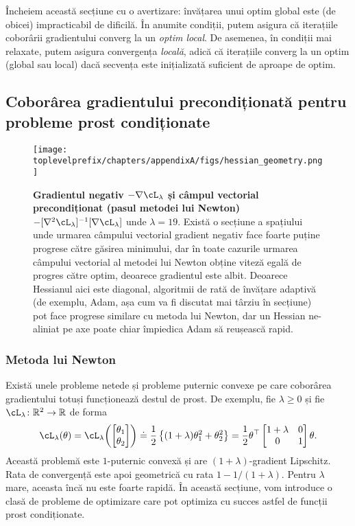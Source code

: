 \documentclass[../../book-main_ro.tex]{subfiles}
\begin{document}
Încheiem această secțiune cu o avertizare: învățarea unui optim global este (de obicei) impracticabil de dificilă. În anumite condiții, putem asigura că iterațiile coborârii gradientului converg la un \textit{optim local}. De asemenea, în condiții mai relaxate, putem asigura convergența \textit{locală}, adică că iterațiile converg la un optim (global sau local) dacă secvența este inițializată suficient de aproape de optim.



\subsection{Coborârea gradientului precondiționată pentru probleme prost condiționate}


\begin{figure}
    \texttt{[image: \\toplevelprefix/chapters/appendixA/figs/hessian\_geometry.png]}
    \caption{\small\textbf{Gradientul negativ \(-\nabla \cL_{\lambda}\) și câmpul vectorial precondiționat (pasul metodei lui Newton) \(-[\nabla^{2}\cL_{\lambda}]^{-1}[\nabla \cL_{\lambda}]\)} unde \(\lambda = 19\). Există o secțiune a spațiului unde urmarea câmpului vectorial gradient negativ face foarte puține progrese către găsirea minimului, dar în toate cazurile urmarea câmpului vectorial al metodei lui Newton obține viteză egală de progres către optim, deoarece gradientul este albit. Deoarece Hessianul aici este diagonal, algoritmii de rată de învățare adaptivă (de exemplu, Adam, așa cum va fi discutat mai târziu în secțiune) pot face progrese similare cu metoda lui Newton, dar un Hessian ne-aliniat pe axe poate chiar împiedica Adam să reușească rapid.}
    \label{fig:hessian_geometry}
\end{figure}

\subsubsection{Metoda lui Newton}

Există unele probleme netede și probleme puternic convexe pe care coborârea gradientului totuși funcționează destul de prost. De exemplu, fie \(\lambda \geq 0\) și fie \(\cL_{\lambda} \colon \R^{2} \to \R\) de forma
\begin{equation}
    \cL_{\lambda}(\theta) = \cL_{\lambda}\rp{\mat{\theta_{1} \\ \theta_{2}}} \doteq \frac{1}{2}\bc{(1 + \lambda) \theta_{1}^{2} + \theta_{2}^{2}} = \frac{1}{2}\theta^{\top}\mat{1 + \lambda & 0 \\ 0 & 1}\theta.
\end{equation}
Această problemă este \(1\)-puternic convexă și are \((1 + \lambda)\)-gradient Lipschitz. Rata de convergență este apoi geometrică cu rata \(1 - 1/(1 + \lambda)\). Pentru \(\lambda\) mare, aceasta încă nu este foarte rapidă. În această secțiune, vom introduce o clasă de probleme de optimizare care pot optimiza cu succes astfel de funcții prost condiționate.
\end{document}
